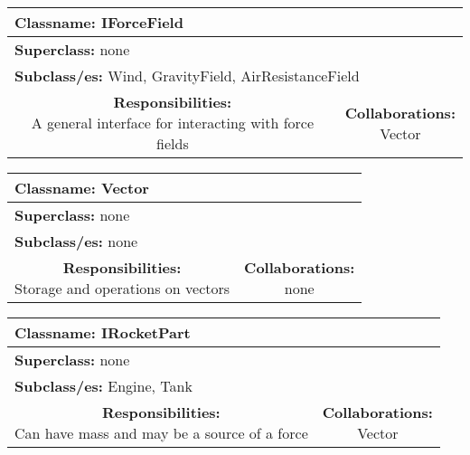 \documentclass{article}
\begin{document}
\begin {center}
\begin{tabular}{|c|c|}
\hline
\multicolumn{2}{|l|}{\textbf{Classname:} IForceField}\\
\hline
\multicolumn{2}{|l|}{\textbf{Superclass:} none}\\
\multicolumn{2}{|l|}{\textbf{Subclass/es:} Wind, GravityField, AirResistanceField}\\
\hline
\parbox[]{5cm}{\vspace{3px}\textbf{Responsibilities:} \\A general interface for interacting with force fields\vspace{3px}} & \parbox[]{5cm}{\textbf{Collaborations:}\\Vector}\\
\hline
 \end{tabular}\vspace{.4cm}

\begin{tabular}{|c|c|}
\hline
\multicolumn{2}{|l|}{\textbf{Classname:} Vector}\\
\hline
\multicolumn{2}{|l|}{\textbf{Superclass:} none}\\
\multicolumn{2}{|l|}{\textbf{Subclass/es:} none}\\
\hline
\parbox[]{5cm}{\vspace{3px}\textbf{Responsibilities:} \\Storage and operations on vectors\vspace{3px}} & \parbox[]{5cm}{\textbf{Collaborations:}\\none}\\
\hline
 \end{tabular}\vspace{.4cm}

\begin{tabular}{|c|c|}
\hline
\multicolumn{2}{|l|}{\textbf{Classname:} IRocketPart}\\
\hline
\multicolumn{2}{|l|}{\textbf{Superclass:} none}\\
\multicolumn{2}{|l|}{\textbf{Subclass/es:} Engine, Tank}\\
\hline
\parbox[]{5cm}{\vspace{3px}\textbf{Responsibilities:} \\Can have mass and may be a source of a force\vspace{3px}} & \parbox[]{5cm}{\textbf{Collaborations:}\\Vector}\\
\hline
 \end{tabular}\vspace{.4cm}


\end{center}
\end{document}

